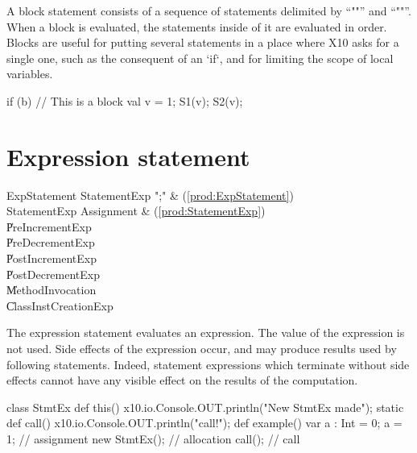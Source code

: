 A block statement consists of a sequence of statements delimited by
``\xcd"{"'' and ``\xcd"}"''. When a block is evaluated, the statements inside
of it are evaluated in order.  Blocks are useful for putting several
statements in a place where X10 asks for a single one, such as the consequent
of an \xcd`if`, and for limiting the scope of local variables.
\begin{xten}
if (b) {
  // This is a block
  val v = 1;
  S1(v); 
  S2(v);
}
\end{xten}



\section{Expression statement}

\begin{bbgrammar}
        ExpStatement \: StatementExp \xcd";" & (\ref{prod:ExpStatement}) \\
        StatementExp \: Assignment & (\ref{prod:StatementExp}) \\
                    \| PreIncrementExp \\
                    \| PreDecrementExp \\
                    \| PostIncrementExp \\
                    \| PostDecrementExp \\
                    \| MethodInvocation \\
                    \| ClassInstCreationExp \\
\end{bbgrammar}

The expression statement evaluates an expression. The value of the expression
is not used. Side effects of the expression occur, and may produce results
used by following statements. Indeed, statement expressions which terminate
without side effects cannot have any visible effect on the results of the
computation. 


\begin{ex}
\begin{xten}
class StmtEx {
  def this() { x10.io.Console.OUT.println("New StmtEx made");  }
  static def call() { x10.io.Console.OUT.println("call!");  }
  def example() {
     var a : Int = 0;
     a = 1; // assignment
     new StmtEx(); // allocation
     call(); // call
  }
}
\end{xten}
%
\end{ex}



